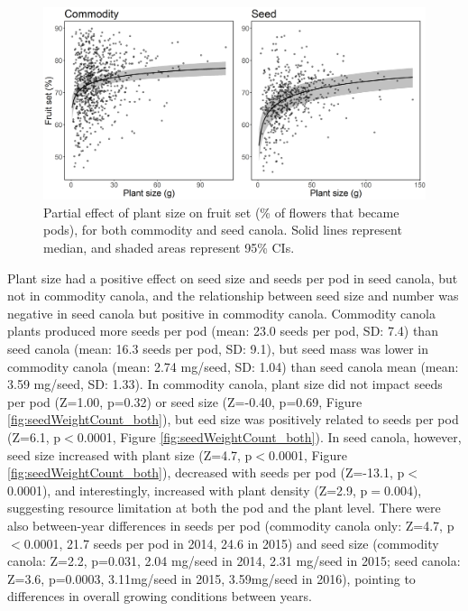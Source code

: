 \documentclass[12pt, draft]{article} %
\begin{document}
\begin{figure}
    \centering
    \includegraphics[width=\textwidth,keepaspectratio=true]{plSizeFlwSurv_both.png} 
    \caption[Partial effect of plant size on fruit set]{Partial effect of plant size on fruit set (\% of flowers that became pods), for both commodity and seed canola. Solid lines represent median, and shaded areas represent 95\% CIs.}
    \label{fig:flwSurv_both}
\end{figure}


Plant size had a positive effect on seed size and seeds per pod in seed canola, but not in commodity canola, and the relationship between seed size and number was negative in seed canola but positive in commodity canola.
Commodity canola plants produced more seeds per pod (mean: 23.0 seeds per pod, SD: 7.4) than seed canola (mean: 16.3 seeds per pod, SD: 9.1), but seed mass was lower in commodity canola (mean: 2.74 mg/seed, SD: 1.04) than seed canola mean (mean: 3.59 mg/seed, SD: 1.33).
In commodity canola, plant size did not impact seeds per pod (Z=1.00, p=0.32) or seed size (Z=-0.40, p=0.69, Figure \ref{fig:seedWeightCount_both}), but eed size was positively related to seeds per pod (Z=6.1, p$<$0.0001, Figure \ref{fig:seedWeightCount_both}).
In seed canola, however, seed size increased with plant size (Z=4.7, p$<$0.0001, Figure \ref{fig:seedWeightCount_both}), decreased with seeds per pod (Z=-13.1, p$<$0.0001), and interestingly, increased with plant density (Z=2.9, p$=$0.004), suggesting resource limitation at both the pod and the plant level. 
There were also between-year differences in seeds per pod (commodity canola only: Z=4.7, p$<$0.0001, 21.7 seeds per pod in 2014, 24.6 in 2015) and seed size (commodity canola: Z=2.2, p=0.031, 2.04 mg/seed in 2014, 2.31 mg/seed in 2015; seed canola: Z=3.6, p=0.0003, 3.11mg/seed in 2015, 3.59mg/seed in 2016), pointing to differences in overall growing conditions between years.
\end{document}
